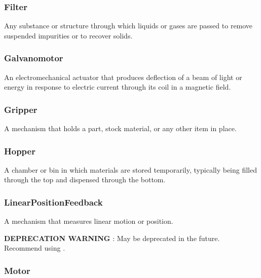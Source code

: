 \subsubsection{Filter}
\label{sec:Filter}



Any substance or structure through which liquids or gases are passed to remove suspended impurities or to recover solids.


\subsubsection{Galvanomotor}
\label{sec:Galvanomotor}



An electromechanical actuator that produces deflection of a beam of light or energy in response to electric current through its coil in a magnetic field.


\subsubsection{Gripper}
\label{sec:Gripper}



A mechanism that holds a part, stock material, or any other item in place.


\subsubsection{Hopper}
\label{sec:Hopper}



A chamber or bin in which materials are stored temporarily, typically being filled through the top and dispensed through the bottom.


\subsubsection{LinearPositionFeedback}
\label{sec:LinearPositionFeedback}



A mechanism that measures linear motion or position.

\textbf{DEPRECATION WARNING} : May be deprecated in the future. Recommend using .


\subsubsection{Motor}
\label{sec:Motor}



